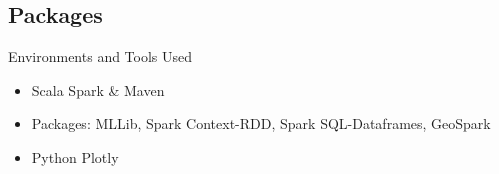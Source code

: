 \documentclass{beamer}
\begin{document}
\subsection{Packages}

\begin{frame}{Environments and Tools Used}

\begin{itemize}
    \item Scala Spark \& Maven
    \item Packages: MLLib, Spark Context-RDD, Spark SQL-Dataframes, GeoSpark
    \item Python Plotly
\end{itemize}
\end{frame}
\end{document}
